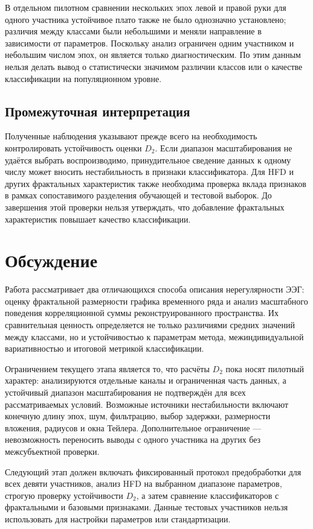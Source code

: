 В отдельном пилотном сравнении нескольких эпох левой и правой руки для одного участника устойчивое плато также не было однозначно установлено; различия между классами были небольшими и меняли направление в зависимости от параметров. Поскольку анализ ограничен одним участником и небольшим числом эпох, он является только диагностическим. По этим данным нельзя делать вывод о статистически значимом различии классов или о качестве классификации на популяционном уровне.

\subsection{Промежуточная интерпретация}

Полученные наблюдения указывают прежде всего на необходимость контролировать устойчивость оценки $D_2$. Если диапазон масштабирования не удаётся выбрать воспроизводимо, принудительное сведение данных к одному числу может вносить нестабильность в признаки классификатора. Для HFD и других фрактальных характеристик также необходима проверка вклада признаков в рамках сопоставимого разделения обучающей и тестовой выборок. До завершения этой проверки нельзя утверждать, что добавление фрактальных характеристик повышает качество классификации.

\section{Обсуждение}

Работа рассматривает два отличающихся способа описания нерегулярности ЭЭГ: оценку фрактальной размерности графика временного ряда и анализ масштабного поведения корреляционной суммы реконструированного пространства. Их сравнительная ценность определяется не только различиями средних значений между классами, но и устойчивостью к параметрам метода, межиндивидуальной вариативностью и итоговой метрикой классификации.

Ограничением текущего этапа является то, что расчёты $D_2$ пока носят пилотный характер: анализируются отдельные каналы и ограниченная часть данных, а устойчивый диапазон масштабирования не подтверждён для всех рассматриваемых условий. Возможные источники нестабильности включают конечную длину эпох, шум, фильтрацию, выбор задержки, размерности вложения, радиусов и окна Тейлера. Дополнительное ограничение — невозможность переносить выводы с одного участника на других без межсубъектной проверки.

Следующий этап должен включать фиксированный протокол предобработки для всех девяти участников, анализ HFD на выбранном диапазоне параметров, строгую проверку устойчивости $D_2$, а затем сравнение классификаторов с фрактальными и базовыми признаками. Данные тестовых участников нельзя использовать для настройки параметров или стандартизации.

